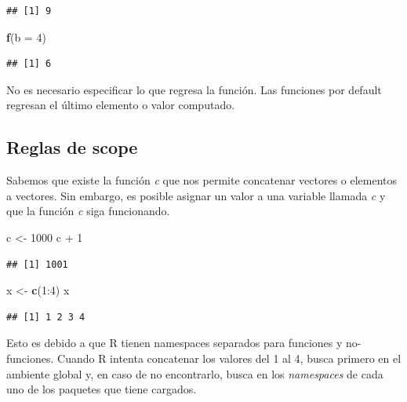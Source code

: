 \documentclass[]{article}
\newenvironment{Shaded}{\begin{snugshade}}{\end{snugshade}}
\newcommand{\KeywordTok}[1]{\textcolor[rgb]{0.13,0.29,0.53}{\textbf{{#1}}}}
\newcommand{\DataTypeTok}[1]{\textcolor[rgb]{0.13,0.29,0.53}{{#1}}}
\newcommand{\DecValTok}[1]{\textcolor[rgb]{0.00,0.00,0.81}{{#1}}}
\newcommand{\StringTok}[1]{\textcolor[rgb]{0.31,0.60,0.02}{{#1}}}
\newcommand{\NormalTok}[1]{{#1}}
\begin{document}
\begin{verbatim}
## [1] 9
\end{verbatim}

\begin{Shaded}
\begin{Highlighting}[]
\KeywordTok{f}\NormalTok{(}\DataTypeTok{b =} \DecValTok{4}\NormalTok{)}
\end{Highlighting}
\end{Shaded}

\begin{verbatim}
## [1] 6
\end{verbatim}

\begin{curiosidad}[Return]
No es necesario especificar lo que regresa la función. Las funciones por
default regresan el último elemento o valor computado.
\end{curiosidad}

\subsection{Reglas de scope}\label{reglas-de-scope}

Sabemos que existe la función \emph{c} que nos permite concatenar
vectores o elementos a vectores. Sin embargo, es posible asignar un
valor a una variable llamada \emph{c} y que la función \emph{c} siga
funcionando.

\begin{Shaded}
\begin{Highlighting}[]
\NormalTok{c <-}\StringTok{ }\DecValTok{1000}
\NormalTok{c +}\StringTok{ }\DecValTok{1}
\end{Highlighting}
\end{Shaded}

\begin{verbatim}
## [1] 1001
\end{verbatim}

\begin{Shaded}
\begin{Highlighting}[]
\NormalTok{x <-}\StringTok{ }\KeywordTok{c}\NormalTok{(}\DecValTok{1}\NormalTok{:}\DecValTok{4}\NormalTok{)}
\NormalTok{x}
\end{Highlighting}
\end{Shaded}

\begin{verbatim}
## [1] 1 2 3 4
\end{verbatim}

Esto es debido a que R tienen namespaces separados para funciones y
no-funciones. Cuando R intenta concatenar los valores del 1 al 4, busca
primero en el ambiente global y, en caso de no encontrarlo, busca en los
\emph{namespaces} de cada uno de los paquetes que tiene cargados.
\end{document}
